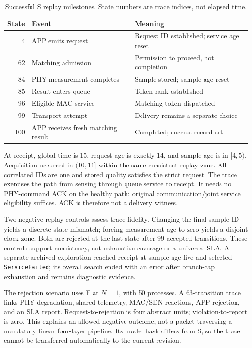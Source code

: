 \documentclass[runningheads]{llncs}
\newcommand{\code}[1]{\texttt{#1}}
\begin{document}
\begin{table}[t]
\caption{Successful S replay milestones. State numbers are trace indices, not elapsed time.}\label{tab:scenario}
\centering\small
\begin{tabularx}{\textwidth}{@{}rXX@{}}
\toprule State & Event & Meaning\\\midrule
4 & APP emits request & Request ID established; service age reset\\
62 & Matching admission & Permission to proceed, not completion\\
84 & PHY measurement completes & Sample stored; sample age reset\\
85 & Result enters queue & Token rank established\\
96 & Eligible MAC service & Matching token dispatched\\
99 & Transport attempt & Delivery remains a separate choice\\
100 & APP receives fresh matching result & Completed; success record set\\\bottomrule
\end{tabularx}
\end{table}

At receipt, global time is 15, request age is exactly 14, and sample age is in $[4,5)$. Acquisition occurred in $(10,11]$ within the same consistent replay zone. All correlated IDs are one and stored quality satisfies the strict request. The trace exercises the path from sensing through queue service to receipt. It needs no PHY-command ACK on the healthy path: original communication/joint service eligibility suffices. ACK is therefore not a delivery witness.

Two negative replay controls assess trace fidelity. Changing the final sample ID yields a discrete-state mismatch; forcing measurement age to zero yields a disjoint clock zone. Both are rejected at the last state after 99 accepted transitions. These controls support consistency, not exhaustive coverage or a universal SLA. A separate archived exploration reached receipt at sample age five and selected \code{ServiceFailed}; its overall search ended with an error after branch-cap exhaustion and remains diagnostic evidence.

The rejection scenario uses F at $N=1$, with 50 processes. A 63-transition trace links PHY degradation, shared telemetry, MAC/SDN reactions, APP rejection, and an SLA report. Request-to-rejection is four abstract units; violation-to-report is zero. This explains an allowed negative outcome, not a packet traversing a mandatory linear four-layer pipeline. Its model hash differs from S, so the trace cannot be transferred automatically to the current revision.
\end{document}
